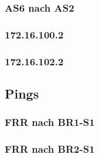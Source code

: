 \subsubsection{AS6 nach AS2}


\subsubsection{172.16.100.2}


\subsubsection{172.16.102.2}



\subsection{Pings}
\subsubsection{FRR nach BR1-S1}



\subsubsection{FRR nach BR2-S1}




